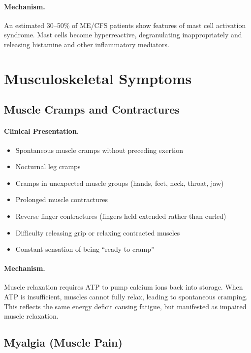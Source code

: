 \paragraph{Mechanism.}
An estimated 30--50\% of ME/CFS patients show features of mast cell activation syndrome. Mast cells become hyper\-reactive, de\-granulating in\-appropriately and releasing histamine and other in\-flammatory mediators.

\section{Musculoskeletal Symptoms}
\label{sec:musculoskeletal-symptoms}

\subsection{Muscle Cramps and Contractures}
\label{subsec:cramps}

\paragraph{Clinical Presentation.}
\begin{itemize}
    \item Spontaneous muscle cramps without preceding exertion
    \item Nocturnal leg cramps
    \item Cramps in unexpected muscle groups (hands, feet, neck, throat, jaw)
    \item Prolonged muscle contractures
    \item Reverse finger contractures (fingers held extended rather than curled)
    \item Difficulty releasing grip or relaxing contracted muscles
    \item Constant sensation of being ``ready to cramp''
\end{itemize}

\paragraph{Mechanism.}
Muscle relaxation requires ATP to pump calcium ions back into storage. When ATP is in\-sufficient, muscles cannot fully relax, leading to spontaneous cramping. This reflects the same energy deficit causing fatigue, but mani\-fested as impaired muscle relaxation.

\subsection{Myalgia (Muscle Pain)}
\label{subsec:myalgia}

